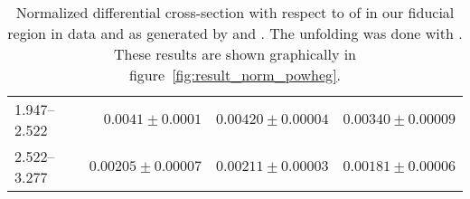 \begin{table}
\begin{center}
\begin{tabular}{@{}l r r r@{}}
            1.947--2.522  &  $0.0041   \pm  0.0001$   &  $0.00420  \pm  0.00004$  &  $0.00340  \pm  0.00009$  \\
            2.522--3.277  &  $0.00205  \pm  0.00007$  &  $0.00211  \pm  0.00003$  &  $0.00181  \pm  0.00006$  \\
            \bottomrule
        \end{tabular}
    \end{center}
    \caption[
        Normalized differential cross-section with respect to \phistar of
        \Ztoee with \POWHEG unfolding.
    ]{
        Normalized differential cross-section with respect to \phistar of
        \Ztoee in our fiducial region in data and as generated by \MADGRAPH and
        \POWHEG. The unfolding was done with \POWHEG. These results are shown
        graphically in figure~\ref{fig:result_norm_powheg}.
    }
    \label{tab:results_norm}
\end{table}
